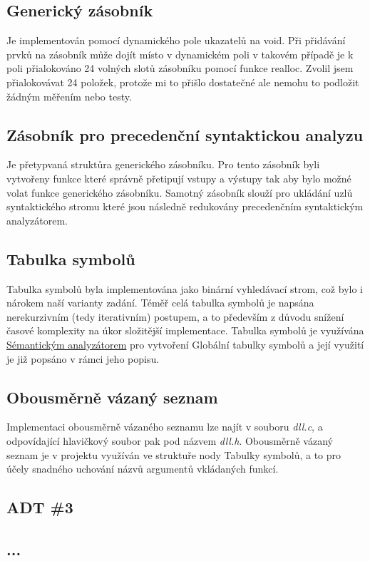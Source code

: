 \documentclass[a4paper, 11pt]{article}
\begin{document}
    \subsection{Generický zásobník}
    Je implementován pomocí dynamického pole ukazatelů na void. Při přidávání prvků na zásobník může dojít místo v dynamickém poli v takovém případě je k poli přialokováno 
    24 volných slotů zásobníku pomocí funkce realloc. Zvolil jsem přialokovávat 24 položek, protože mi to přišlo dostatečné ale nemohu to podložit žádným měřením
    nebo testy.
    
    \subsection{Zásobník pro precedenční syntaktickou analyzu}
    Je přetypvaná struktůra generického zásobníku. Pro tento zásobník byli vytvořeny funkce které správně přetipují vstupy a výstupy tak aby bylo možné volat funkce
    generického zásobníku. Samotný zásobník slouží pro ukládání uzlů syntaktického stromu které jsou následně redukovány precedenčním syntaktickým analyzátorem.

	\subsection{Tabulka symbolů}
	\label{symtab}
	Tabulka symbolů byla implementována jako binární vyhledávací strom, což bylo i nárokem naší varianty zadání. Téměř celá tabulka symbolů je napsána 
	nerekurzivním (tedy iterativním) postupem, a to především z důvodu snížení časové komplexity na úkor složitější implementace. Tabulka symbolů je 
	využívána \hyperref[semantic]{Sémantickým analyzátorem} pro vytvoření Globální tabulky symbolů a její využití je již popsáno v rámci jeho popisu.
	\subsection{Obousměrně vázaný seznam}
	Implementaci obousměrně vázaného seznamu lze najít v souboru \textit{dll.c}, a odpovídající hlavičkový soubor pak pod názvem \textit{dll.h}. Obousměrně 
	vázaný seznam je v projektu využíván ve struktuře nody Tabulky symbolů, a to pro účely snadného uchování názvů argumentů vkládaných funkcí.
	\subsection{ADT \#3}
	\subsection{...}
\end{document}
